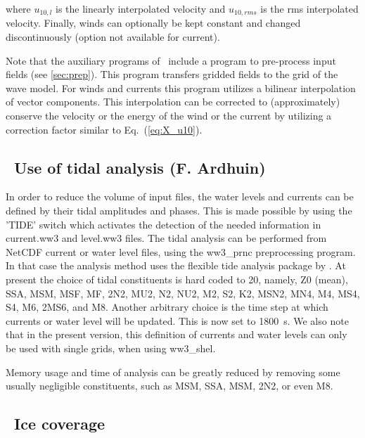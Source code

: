 \noindent
where $u_{10,l}$ is the linearly interpolated velocity and $u_{10,rms}$ is the
rms interpolated velocity. Finally, winds can optionally be kept constant and
changed discontinuously (option not available for current).

\vspace{\baselineskip} \noindent 
Note that the auxiliary programs of \ws\ include a program to pre-process
input fields (see \para\ref{sec:prep}). This program transfers gridded fields
to the grid of the wave model. For winds and currents this program utilizes a
bilinear interpolation of vector components. This interpolation can be
corrected to (approximately) conserve the velocity or the energy of the wind
or the current by utilizing a correction factor similar to
Eq.~(\ref{eq:X_u10}).


\pb
\vssub
\subsection{~Use of tidal analysis \hfill {\rm (F. Ardhuin)}}
\vssub

\noindent
In order to reduce the volume of input files, the water levels and currents 
can be defined by their tidal amplitudes and phases. This is made possible 
by using the 'TIDE' switch which activates the detection of the needed 
information in current.ww3 
and level.ww3 files. The tidal analysis can be performed from NetCDF current 
or water level files, using the ww3\_prnc preprocessing program. In that case 
the analysis method uses the flexible tide analysis package by \cite{art:For09}. 
At present the choice of tidal constituents is hard coded to 20, namely, 
Z0 (mean), SSA, MSM, MSF, MF, 2N2, MU2, N2, NU2, M2, S2, K2, MSN2, MN4, M4, MS4, S4,
M6, 2MS6, and  M8. Another arbitrary choice is the time step at which currents or water 
level will be updated. This is now set to 1800~s. We also note that in the present 
version, this definition of currents and water levels can only be used with single grids, 
when using ww3\_shel. 

Memory usage and time of analysis can be greatly reduced by removing some usually negligible constituents, 
such as MSM, SSA,  MSM, 2N2, or even M8. 


\vssub
\subsection{~Ice coverage} \label{sub:ice}
\vssub

